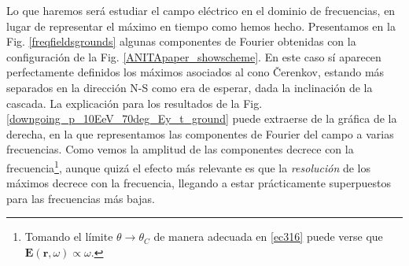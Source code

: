 \documentclass[12 pt, a4paper]{article} %
\numberwithin{equation}{section}
\numberwithin{figure}{section}
\numberwithin{table}{section}
\newcommand{\vect}[1]{\boldsymbol{\mathbf{#1}}}
\begin{document}
Lo que haremos será estudiar el campo eléctrico en el dominio de frecuencias, en lugar de representar el máximo en tiempo como hemos hecho. Presentamos en la Fig. \ref{freqfieldsgrounds} algunas componentes de Fourier obtenidas con la configuración de la Fig. \ref{ANITApaper_showscheme}. En este caso sí aparecen perfectamente definidos los máximos asociados al cono \v{C}erenkov, estando más separados en la dirección N-S como era de esperar, dada la inclinación de la cascada. La explicación para los resultados de la Fig. \ref{downgoing_p_10EeV_70deg_Ey_t_ground} puede extraerse de la gráfica de la derecha, en la que representamos las componentes de Fourier del campo a varias frecuencias. Como vemos la amplitud de las componentes decrece con la frecuencia\footnote{ Tomando el límite $\theta\rightarrow\theta_C$ de manera adecuada en \eqref{ec316} puede verse que $\vect{E}\left(\vect{r},\omega\right)\propto\omega$.}, aunque quizá el efecto más relevante es que la \textit{resolución} de los máximos decrece con la frecuencia, llegando a estar prácticamente superpuestos para las frecuencias más bajas. 
\end{document}
